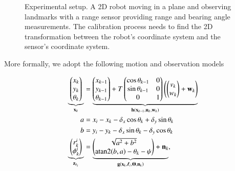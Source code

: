 \begin{figure}[t]
\caption{Experimental setup. A 2D robot moving in a plane and observing
  landmarks with a range sensor providing range and bearing angle measurements.
  The calibration process needs to find the 2D transformation between the
  robot's coordinate system and the sensor's coordinate system.}
\label{fig:exp_setup}
\end{figure}

More formally, we adopt the following motion and observation models

\begin{equation}\label{eqn:exp_model}
  \begin{aligned}
  \underbrace {
  \begin{pmatrix}
  x_k\\
  y_k\\
  \theta_k
  \end{pmatrix}}_{\mathbf{x}_k}&=
  \underbrace{
  \begin{pmatrix}
  x_{k-1}\\
  y_{k-1}\\
  \theta_{k-1}
  \end{pmatrix} + T
  \begin{pmatrix}
  \cos\theta_{k-1}&0\\
  \sin\theta_{k-1}&0\\
  0&1
  \end{pmatrix}
  \left(\begin{pmatrix}
  v_k\\
  w_k
  \end{pmatrix}
  + \mathbf{w}_k\right)
  }_{\mathbf{h}(\mathbf{x}_{k-1}, \mathbf{u}_k, \mathbf{w}_k)}\\
  a &= x_i - x_k - \delta_x\cos\theta_k + \delta_y\sin\theta_k\\
  b &= y_i - y_k - \delta_x\sin\theta_k - \delta_y\cos\theta_k\\
  \underbrace {
  \begin{pmatrix}
  r_k^i\\
  \phi_k^i
  \end{pmatrix} }_{\mathbf{z}_{k_i}}&=
  \underbrace {
  \begin{pmatrix}
  \sqrt{a^2 + b^2}\\
  \atan2(b, a) - \theta_k - \psi
  \end{pmatrix}
  + \mathbf{n}_k}_{\mathbf{g}(\mathbf{x}_{k}, \boldsymbol{\ell}_i,
    \boldsymbol{\Theta}, \mathbf{n}_k)},
  \end{aligned}
\end{equation}

